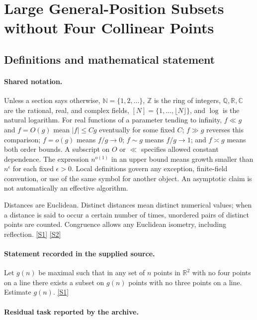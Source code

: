 \documentclass[11pt,a4paper]{article}
\newcommand{\N}{\mathbb{N}}
\newcommand{\Z}{\mathbb{Z}}
\newcommand{\Q}{\mathbb{Q}}
\newcommand{\R}{\mathbb{R}}
\newcommand{\C}{\mathbb{C}}
\newcommand{\sref}[2]{\hyperlink{source:#1:#2}{[S#2]}}
\begin{document}
\section{Large General-Position Subsets without Four Collinear Points}\label{statement}


\subsection{Definitions and mathematical statement}

\paragraph{Shared notation.}Unless a section says otherwise, $\N=\{1,2,\ldots\}$,
$\Z$ is the ring of integers, $\Q,\R,\C$ are the rational, real, and complex
fields, $[N]=\{1,\ldots,\lfloor N\rfloor\}$, and $\log$ is the natural
logarithm. For real functions of a parameter tending to infinity,
$f\ll g$ and $f=O(g)$ mean $|f|\leq Cg$ eventually for some fixed $C$;
$f\gg g$ reverses this comparison; $f=o(g)$ means $f/g\to0$;
$f\sim g$ means $f/g\to1$; and $f\asymp g$ means both order bounds.
A subscript on $O$ or $\ll$ specifies allowed constant dependence.
The expression $n^{o(1)}$ in an upper bound means growth smaller than
$n^\epsilon$ for each fixed $\epsilon>0$. Local definitions govern any
exception, finite-field convention, or use of the same symbol for another
object. An asymptotic claim is not automatically an effective algorithm.



Distances are Euclidean. Distinct distances mean distinct numerical values; when a distance is said to occur a certain number of times, unordered pairs of distinct points are counted. Congruence allows any Euclidean isometry, including reflection. \sref{statement}{1} \sref{statement}{2}

\paragraph{Statement recorded in the supplied source.}
Let $g(n)$ be maximal such that in any set of $n$ points in $\mathbb{R}^2$ with no four points on a line there exists a subset on $g(n)$ points with no three points on a line. Estimate $g(n)$. \sref{statement}{1}

\paragraph{Residual task reported by the archive.}
\end{document}
